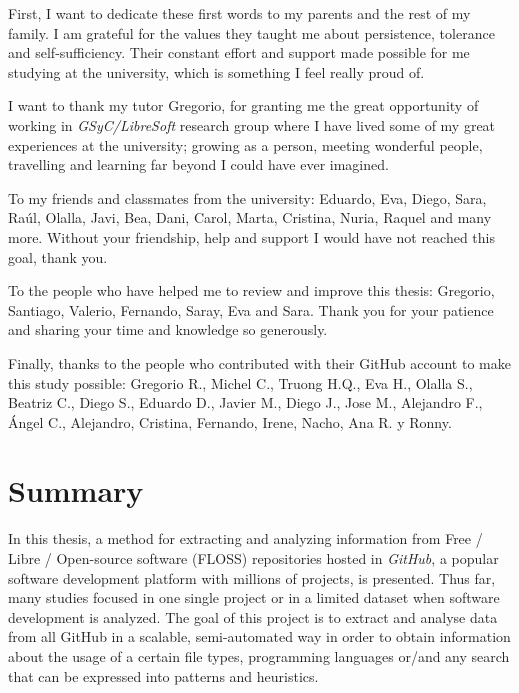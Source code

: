 \documentclass[a4paper, 12pt]{book}
\begin{document}
First, I want to dedicate these first words to my parents and the rest of my family. I am grateful for the values
they taught me about persistence, tolerance and self-sufficiency. Their constant effort and support made possible
for me studying at the university, which is something I feel really proud of.

I want to thank my tutor Gregorio, for granting me the great opportunity of working
in \emph{GSyC/LibreSoft} research group where I have lived some of my great experiences at the university;
growing as a person, meeting wonderful people, travelling and learning far beyond I could have ever imagined.

To my friends and classmates from the university: Eduardo, Eva, Diego, Sara, Raúl, Olalla, Javi, Bea, Dani, Carol, Marta,
Cristina, Nuria, Raquel and many more. Without your friendship, help and support I would have not reached this goal, thank you.

To the people who have helped me to review and improve this thesis: Gregorio, Santiago, Valerio, Fernando, Saray, Eva and Sara. Thank you
for your patience and sharing your time and knowledge so generously.

Finally, thanks to the people who contributed with their GitHub account to make this study possible:
Gregorio R., Michel C., Truong H.Q., Eva H., Olalla S., Beatriz C., Diego S.,
Eduardo D., Javier M., Diego J., Jose M., Alejandro F., Ángel C., Alejandro, Cristina, Fernando, Irene, Nacho, Ana R. y Ronny.
\chapter*{Summary}
In this thesis, a method for extracting and analyzing information from Free / Libre / Open-source
software (FLOSS) repositories hosted in \emph{GitHub}, a popular software development platform with millions of projects, is presented. Thus far, many studies focused
in one single project or in a limited dataset when software development is analyzed. The goal of this project is to
extract and analyse data from all GitHub in a scalable, semi-automated way in order to obtain information about
the usage of a certain file types, programming languages or/and any search that can be expressed into patterns and heuristics.
\end{document}
